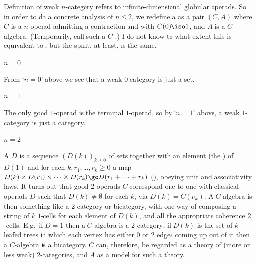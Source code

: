 
Definition  of weak $n$-category refers to infinite-dimensional
globular operads.  So in order to do a concrete analysis of $n\leq 2$, we
redefine a  as a pair $(C,A)$ where $C$ is a
$n$-operad admitting a contraction and with $C(0) \iso 1$, and $A$ is a
$C$-algebra.  (Temporarily, call such a $C$ .)  I do not know to
what extent this is equivalent to , but the spirit, at least, is the
same.


\paragraph{$n=0$} 

From `$n=0$' above we see that a weak $0$-category is just a set.


\paragraph{$n=1$}

The only good $1$-operad is the terminal $1$-operad, so by `$n=1$' above, a
weak $1$-category is just a category.


\paragraph{$n=2$}

A  $D$ is a sequence $(D(k))_{k\geq
0}$ of sets together with an element (the ) of $D(1)$ and for
each $k, r_1, \ldots, r_k \geq 0$ a map $ D(k) \times D(r_1) \times \cdots
\times D(r_k) \go D(r_1 + \cdots + r_k) $ (), obeying unit
and associativity laws.  It turns out that good $2$-operads $C$ correspond
one-to-one with classical operads $D$ such that $D(k) \neq \emptyset$ for
each $k$, via $D(k) = C(\nu_k)$.  A $C$-algebra is then something like a
2-category or bicategory, with one way of composing a string of $k$ $1$-cells
for each element of $D(k)$, and all the appropriate coherence $2$-cells.
E.g.\ if $D=1$ then a $C$-algebra is a 2-category; if $D(k)$ is the set of
$k$-leafed trees in which each vertex has either $0$ or $2$ edges coming up
out of it then a $C$-algebra is a bicategory.  $C$ can, therefore, be
regarded as a theory of (more or less weak) 2-categories, and $A$ as a model
for such a theory.














